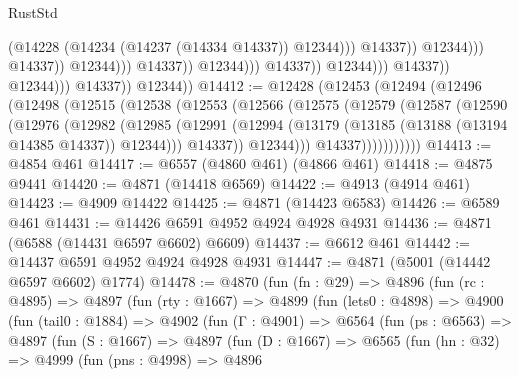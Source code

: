 \begin{lexlean}{RustStd}
\begin{coremodule}
                                                                (@14228
                                                                  (@14234
                                                                    (@14237 (@14334 @14337))
                                                                    @12344)))
                                                              @14337))
                                                          @12344)))
                                                    @14337))
                                                @12344)))
                                          @14337))
                                      @12344)))
                                @14337))
                            @12344)))
                      @14337))
                  @12344)))
            @14337))
        @12344))
@14412 := @12428
    (@12453
      (@12494
        (@12496
          (@12498
            (@12515
              (@12538
                (@12553
                  (@12566
                    (@12575
                      (@12579
                        (@12587
                          (@12590
                            (@12976
                              (@12982
                                (@12985
                                  (@12991
                                    (@12994
                                      (@13179 (@13185 (@13188 (@13194 @14385 @14337)) @12344)))
                                    @14337))
                                @12344)))
                          @14337)))))))))))
@14413 := @4854 @461
@14417 := @6557 (@4860 @461) (@4866 @461)
@14418 := @4875 @9441
@14420 := @4871 (@14418 @6569)
@14422 := @4913 (@4914 @461)
@14423 := @4909 @14422
@14425 := @4871 (@14423 @6583)
@14426 := @6589 @461
@14431 := @14426 @6591 @4952 @4924 @4928 @4931
@14436 := @4871 (@6588 (@14431 @6597 @6602) @6609)
@14437 := @6612 @461
@14442 := @14437 @6591 @4952 @4924 @4928 @4931
@14447 := @4871 (@5001 (@14442 @6597 @6602) @1774)
@14478 := @4870
    (fun (fn : @29) =>
    @4896
      (fun (rc : @4895) =>
      @4897
        (fun (rty : @1667) =>
        @4899
          (fun (lets0 : @4898) =>
          @4900
            (fun (tail0 : @1884) =>
            @4902
              (fun (Γ : @4901) =>
              @6564
                (fun (ps : @6563) =>
                @4897
                  (fun (S : @1667) =>
                  @4897
                    (fun (D : @1667) =>
                    @6565
                      (fun (hn : @32) =>
                      @4999
                        (fun (pns : @4998) =>
                        @4896

\end{coremodule}
\end{lexlean}
